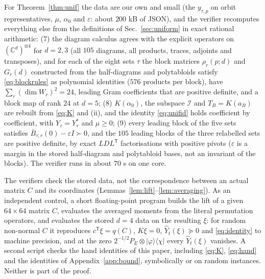\documentclass[aps,pra,twocolumn,superscriptaddress,nofootinbib,longbibliography]{revtex4-2}
\newcommand{\C}{\mathbb C}
\newcommand{\ket}[1]{|#1\rangle}
\newcommand{\bra}[1]{\langle #1|}
\newcommand{\T}{\mathsf T}
\newcommand{\Yh}{\widehat Y}
\theoremstyle{plain}
\theoremstyle{definition}
\theoremstyle{remark}
\begin{document}
For Theorem~\ref{thm:unif} the data are our own and small (the $y_{\tau,p}$ on orbit representatives, $\mu$, $\alpha_0$ and $\varepsilon$: about $200$ kB of JSON), and the verifier recomputes everything else from the definitions of Sec.~\ref{sec:uniform} in exact rational arithmetic: (7) the diagram calculus agrees with the explicit operators on $(\C^d)^{\otimes4}$ for $d=2,3$ (all $105$ diagrams, all products, traces, adjoints and transposes), and for each of the eight sets $\tau$ the block matrices $\rho_r(p;d)$ and $G_r(d)$ constructed from the half-diagrams and polytabloids satisfy \eqref{eq:blockrules} as polynomial identities ($576$ products per block), have $\sum_r(\dim W_r)^2=24$, leading Gram coefficients that are positive definite, and a block map of rank $24$ at $d=5$; (8) $K(\alpha_0)$, the subspace $\mathcal I$ and $T_B=K(a_B)$ are rebuilt from \eqref{eq:K} and (ii), and the identity \eqref{eq:unifid} holds coefficient by coefficient, with $Y_\tau=Y_\tau^*$ and $\mu\ge0$; (9) every leading block of the five sets satisfies $\bar B_{\tau,r}(0)-\varepsilon I\succ0$, and the $105$ leading blocks of the three relabelled sets are positive definite, by exact $LDL^\T$ factorisations with positive pivots ($\varepsilon$ is a margin in the stored half-diagram and polytabloid bases, not an invariant of the blocks). The verifier runs in about $70$ s on one core.

The verifiers check the stored data, not the correspondence between an actual matrix $C$ and its coordinates (Lemmas~\ref{lem:lift}--\ref{lem:averaging}). As an independent control, a short floating-point program builds the lift of a given $64\times64$ matrix $C$, evaluates the averaged moments from the literal permutation operators, and evaluates the stored $d=4$ data on the resulting $\xi$: for random non-normal $C$ it reproduces $c^{\T}\xi=q(C)$, $K\xi=0$, $\Yh_t(\xi)\succeq0$ and \eqref{eq:identity} to machine precision, and at the zero $2^{-1/2}P_E\otimes\ket\varphi\bra\chi$ every $\Yh_t(\xi)$ vanishes. A second script checks the hand identities of this paper, including \eqref{eq:K}, \eqref{eq:hand} and the identities of Appendix~\ref{app:bound}, symbolically or on random instances. Neither is part of the proof.
\end{document}
